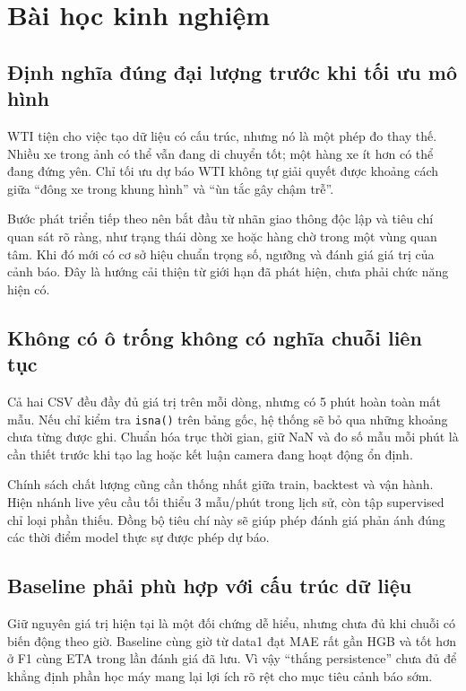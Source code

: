 \section{Bài học kinh nghiệm}

    \subsection{Định nghĩa đúng đại lượng trước khi tối ưu mô hình}
    WTI tiện cho việc tạo dữ liệu có cấu trúc, nhưng nó là một phép đo thay thế. Nhiều xe trong ảnh có thể vẫn đang di chuyển tốt; một hàng xe ít hơn có thể đang đứng yên. Chỉ tối ưu dự báo WTI không tự giải quyết được khoảng cách giữa ``đông xe trong khung hình'' và ``ùn tắc gây chậm trễ''.

    Bước phát triển tiếp theo nên bắt đầu từ nhãn giao thông độc lập và tiêu chí quan sát rõ ràng, như trạng thái dòng xe hoặc hàng chờ trong một vùng quan tâm. Khi đó mới có cơ sở hiệu chuẩn trọng số, ngưỡng và đánh giá giá trị của cảnh báo. Đây là hướng cải thiện từ giới hạn đã phát hiện, chưa phải chức năng hiện có.

    \subsection{Không có ô trống không có nghĩa chuỗi liên tục}
    Cả hai CSV đều đầy đủ giá trị trên mỗi dòng, nhưng có 5 phút hoàn toàn mất mẫu. Nếu chỉ kiểm tra \texttt{isna()} trên bảng gốc, hệ thống sẽ bỏ qua những khoảng chưa từng được ghi. Chuẩn hóa trục thời gian, giữ NaN và đo số mẫu mỗi phút là cần thiết trước khi tạo lag hoặc kết luận camera đang hoạt động ổn định.

    Chính sách chất lượng cũng cần thống nhất giữa train, backtest và vận hành. Hiện nhánh live yêu cầu tối thiểu 3 mẫu/phút trong lịch sử, còn tập supervised chỉ loại phần thiếu. Đồng bộ tiêu chí này sẽ giúp phép đánh giá phản ánh đúng các thời điểm model thực sự được phép dự báo.

    \subsection{Baseline phải phù hợp với cấu trúc dữ liệu}
    Giữ nguyên giá trị hiện tại là một đối chứng dễ hiểu, nhưng chưa đủ khi chuỗi có biến động theo giờ. Baseline cùng giờ từ data1 đạt MAE rất gần HGB và tốt hơn ở F1 cùng ETA trong lần đánh giá đã lưu. Vì vậy ``thắng persistence'' chưa đủ để khẳng định phần học máy mang lại lợi ích rõ rệt cho mục tiêu cảnh báo sớm.

